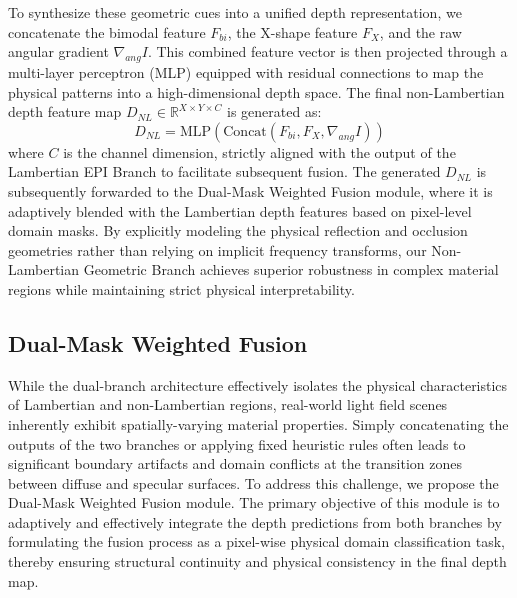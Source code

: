 \documentclass[lettersize,journal]{IEEEtran}
\begin{document}
To synthesize these geometric cues into a unified depth representation, we concatenate the bimodal feature $F_{bi}$, the X-shape feature $F_{X}$, and the raw angular gradient $\nabla_{ang} I$. This combined feature vector is then projected through a multi-layer perceptron (MLP) equipped with residual connections to map the physical patterns into a high-dimensional depth space. The final non-Lambertian depth feature map $D_{NL} \in \mathbb{R}^{X \times Y \times C}$ is generated as:
\begin{equation}
D_{NL} = \text{MLP} \left( \text{Concat}(F_{bi}, F_{X}, \nabla_{ang} I) \right)
\label{eq:ch3_16}
\end{equation}
where $C$ is the channel dimension, strictly aligned with the output of the Lambertian EPI Branch to facilitate subsequent fusion. The generated $D_{NL}$ is subsequently forwarded to the Dual-Mask Weighted Fusion module, where it is adaptively blended with the Lambertian depth features based on pixel-level domain masks. By explicitly modeling the physical reflection and occlusion geometries rather than relying on implicit frequency transforms, our Non-Lambertian Geometric Branch achieves superior robustness in complex material regions while maintaining strict physical interpretability.

\subsection{Dual-Mask Weighted Fusion}

While the dual-branch architecture effectively isolates the physical characteristics of Lambertian and non-Lambertian regions, real-world light field scenes inherently exhibit spatially-varying material properties. Simply concatenating the outputs of the two branches or applying fixed heuristic rules \cite{fixed_heuristic_rules} often leads to significant boundary artifacts and domain conflicts at the transition zones between diffuse and specular surfaces. To address this challenge, we propose the Dual-Mask Weighted Fusion module. The primary objective of this module is to adaptively and effectively integrate the depth predictions from both branches by formulating the fusion process as a pixel-wise physical domain classification task, thereby ensuring structural continuity and physical consistency in the final depth map.
\end{document}
